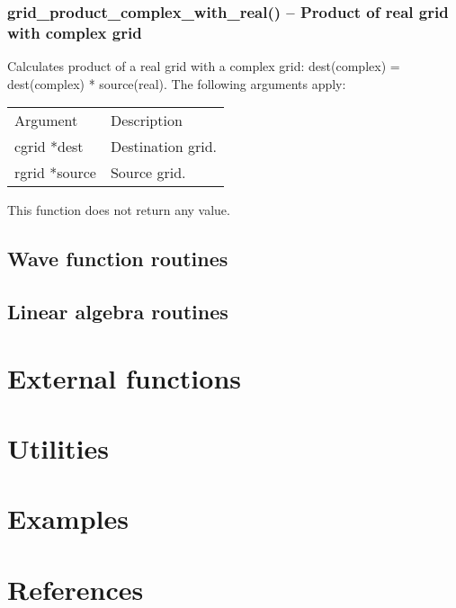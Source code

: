 \documentclass[12pt,letterpaper]{article}
\begin{document}
\subsubsection{grid\_product\_complex\_with\_real() -- Product of real grid with complex grid}

Calculates product of a real grid with a complex grid: dest(complex) = dest(complex) * source(real). The following arguments apply:
\begin{longtable}{p{} p{}}
Argument & Description\\
\cline{1-2}
cgrid *dest & Destination grid.\\
rgrid *source & Source grid.\\
\end{longtable}
\noindent
This function does not return any value.

\subsection{Wave function routines}

\subsection{Linear algebra routines}

\section{External functions}

\section{Utilities}

\section{Examples}

\section{References}
\end{document}
